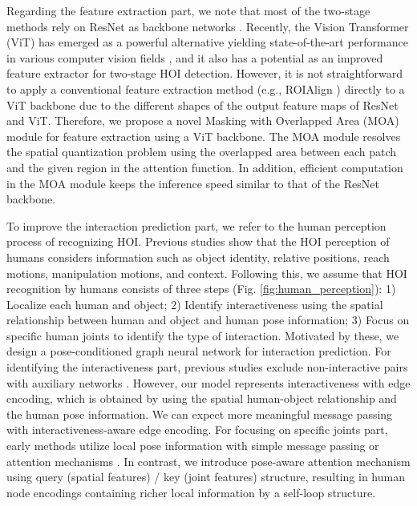 \documentclass[10pt,twocolumn,letterpaper]{article}
\begin{document}
Regarding the feature extraction part, we note that most of the two-stage methods rely on ResNet \cite{he2016deep} as backbone networks \cite{hou2020visual, hou2021affordance, zhang2021spatially}. Recently, the Vision Transformer (ViT) has emerged as a powerful alternative yielding state-of-the-art performance in various computer vision fields \cite{radford2021learning, touvron2021training, strudel2021segmenter}, and it also has a potential as an improved feature extractor for two-stage HOI detection. However, it is not straightforward to apply a conventional feature extraction method (e.g., ROIAlign \cite{he2017mask}) directly to a ViT backbone due to the different shapes of the output feature maps of ResNet and ViT. Therefore, we propose a novel Masking with Overlapped Area (MOA) module for feature extraction using a ViT backbone. The MOA module resolves the spatial quantization problem using the overlapped area between each patch and the given region in the attention function. In addition, efficient computation in the MOA module keeps the inference speed similar to that of the ResNet backbone.




To improve the interaction prediction part, we refer to the human perception process of recognizing HOI. Previous studies\cite{gupta2007objects, gupta2009observing, baldassano2017human} show that the HOI perception of humans considers information such as object identity, relative positions, reach motions, manipulation motions, and context. Following this, we assume that HOI recognition by humans consists of three steps (Fig. \ref{fig:human_perception}): 1) Localize each human and object; 2) Identify interactiveness using the spatial relationship between human and object and human pose information; 3) Focus on specific human joints to identify the type of interaction. Motivated by these, we design a pose-conditioned graph neural network for interaction prediction. For identifying the interactiveness part, previous studies exclude non-interactive pairs with auxiliary networks \cite{liu2022interactiveness, li2019transferable}. However, our model represents interactiveness with edge encoding, which is obtained by using the spatial human-object relationship and the human pose information. We can expect more meaningful message passing with interactiveness-aware edge encoding. For focusing on specific joints part, early methods utilize local pose information with simple message passing or attention mechanisms \cite{wan2019pose, zhou2019relation}. 
In contrast, we introduce pose-aware attention mechanism using query (spatial features) / key (joint features) structure, resulting in human node encodings containing richer local information by a self-loop structure.
\end{document}
